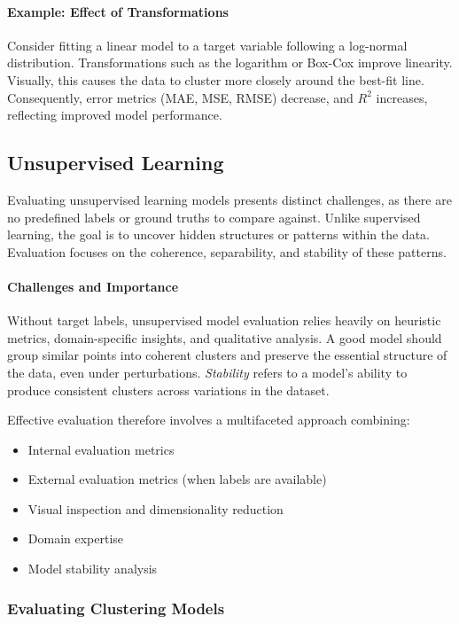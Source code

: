 \documentclass[9pt]{extarticle}
\begin{document}
\paragraph{Example: Effect of Transformations}

Consider fitting a linear model to a target variable following a log-normal distribution. Transformations such as the logarithm or Box-Cox improve linearity. Visually, this causes the data to cluster more closely around the best-fit line. Consequently, error metrics (MAE, MSE, RMSE) decrease, and $R^2$ increases, reflecting improved model performance.


\subsection{Unsupervised Learning}

Evaluating unsupervised learning models presents distinct challenges, as there are no predefined labels or ground truths to compare against. Unlike supervised learning, the goal is to uncover hidden structures or patterns within the data. Evaluation focuses on the coherence, separability, and stability of these patterns.

\paragraph{Challenges and Importance}

Without target labels, unsupervised model evaluation relies heavily on heuristic metrics, domain-specific insights, and qualitative analysis. A good model should group similar points into coherent clusters and preserve the essential structure of the data, even under perturbations. \textit{Stability} refers to a model's ability to produce consistent clusters across variations in the dataset.

Effective evaluation therefore involves a multifaceted approach combining:
\begin{itemize}
    \item Internal evaluation metrics
    \item External evaluation metrics (when labels are available)
    \item Visual inspection and dimensionality reduction
    \item Domain expertise
    \item Model stability analysis
\end{itemize}

\subsubsection*{Evaluating Clustering Models}
\end{document}

